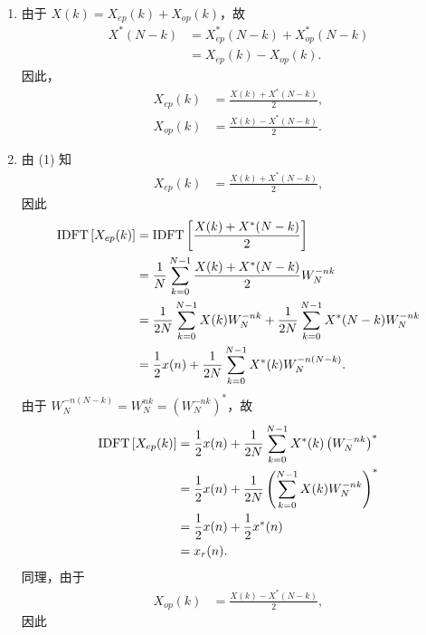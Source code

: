 \begin{solution}
    \begin{enumerate}[label=(\arabic*)]
        \item 由于 $X(k) = X_{ep}(k) + X_{op}(k)$，故
            \begin{align*}
                X^*(N - k) & = X_{ep}^*(N - k) + X_{op}^*(N - k) \\
                & = X_{ep}(k) - X_{op}(k).
            \end{align*}
            因此，
            \begin{align*}
                X_{ep}(k) & = \frac{X(k) + X^*(N - k)}{2}, \\
                X_{op}(k) & = \frac{X(k) - X^*(N - k)}{2}.
            \end{align*}
        \item 由 (1) 知
            \begin{align*}
                X_{ep}(k) & = \frac{X(k) + X^*(N - k)}{2},
            \end{align*}
            因此
            \begin{align*}
                \mathrm{IDFT}\left[X_{ep}(k)\right] & = \mathrm{IDFT}\left[\frac{X(k) + X^*(N - k)}{2}\right] \\
                & = \frac{1}{N}\sum_{k = 0}^{N - 1}\frac{X(k) + X^*(N - k)}{2}W_N^{-nk} \\
                & = \frac{1}{2N}\sum_{k = 0}^{N - 1}X(k)W_N^{-nk} + \frac{1}{2N}\sum_{k = 0}^{N - 1}X^*(N - k)W_N^{-nk} \\
                & = \frac{1}{2}x(n) + \frac{1}{2N}\sum_{k = 0}^{N - 1}X^*(k)W_N^{-n(N - k)}.
            \end{align*}
            由于 $W_N^{-n(N - k)} = W_N^{nk} = \left(W_N^{-nk}\right)^*$，故
            \begin{align*}
                \mathrm{IDFT}\left[X_{ep}(k)\right] & = \frac{1}{2}x(n) + \frac{1}{2N}\sum_{k = 0}^{N - 1}X^*(k)\left(W_N^{-nk}\right)^* \\
                & = \frac{1}{2}x(n) + \frac{1}{2N}\left(\sum_{k = 0}^{N - 1}X(k)W_N^{-nk}\right)^* \\
                & = \frac{1}{2}x(n) + \frac{1}{2}x^*(n) \\
                & = x_r(n).
            \end{align*}
            同理，由于
            \begin{align*}
                X_{op}(k) & = \frac{X(k) - X^*(N - k)}{2},
            \end{align*}
            因此

\end{enumerate}
\end{solution}
